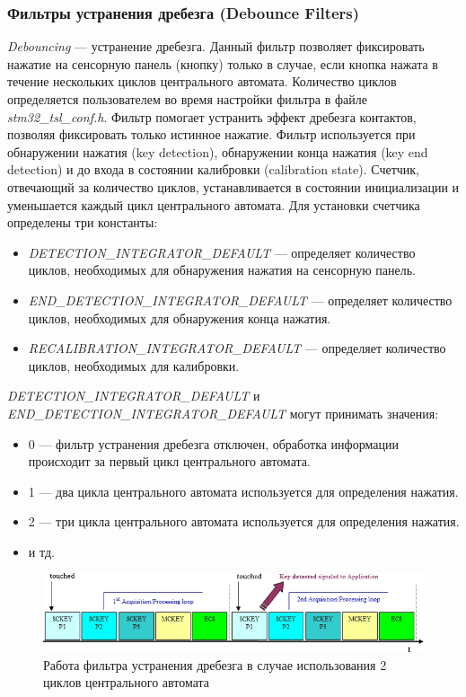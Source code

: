 \subsubsection{Фильтры устранения дребезга (Debounce Filters)}

\textit{Debouncing} --- устранение дребезга. Данный фильтр позволяет фиксировать нажатие на сенсорную панель (кнопку) только в случае, если кнопка нажата в течение нескольких циклов центрального автомата. Количество циклов определяется пользователем во время настройки фильтра в файле \textit{stm32\_tsl\_conf.h}. Фильтр помогает устранить эффект дребезга контактов, позволяя фиксировать только истинное нажатие. Фильтр используется при обнаружении нажатия (key detection), обнаружении конца нажатия (key end detection) и до входа в состоянии калибровки (calibration state). Счетчик, отвечающий за количество циклов, устанавливается в состоянии инициализации и уменьшается каждый цикл центрального автомата. Для установки счетчика определены три константы:
\begin{itemize}
\item \textit{DETECTION\_INTEGRATOR\_DEFAULT} --- определяет количество циклов, необходимых для обнаружения нажатия на сенсорную панель.

\item \textit{END\_DETECTION\_INTEGRATOR\_DEFAULT} --- определяет количество циклов, необходимых для обнаружения конца нажатия.

\item \textit{RECALIBRATION\_INTEGRATOR\_DEFAULT} --- определяет количество циклов, необходимых для калибровки.
\end{itemize}
\textit{DETECTION\_INTEGRATOR\_DEFAULT} и \\ \textit{END\_DETECTION\_INTEGRATOR\_DEFAULT} могут принимать значения:
\begin{itemize}
\item 0 --- фильтр устранения дребезга отключен, обработка информации происходит за первый цикл центрального автомата.
\item 1 --- два цикла центрального автомата используется для определения нажатия.
\item 2 --- три цикла центрального автомата используется для определения нажатия.
\item и тд.
\end{itemize}
\begin{figure}[H]
\begin{center}
\includegraphics[scale=0.7]{Image/63.jpg} 
\end{center}
\caption{Работа фильтра устранения дребезга в случае использования 2 циклов центрального автомата}
\end{figure}



